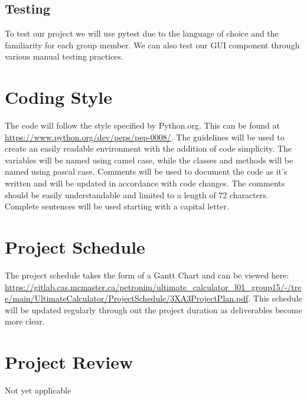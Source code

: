 \documentclass{article}
\begin{document}
\subsection{Testing}
To test our project we will use pytest due to the language of choice and the familiarity for each group member. We can also test our GUI component through various manual testing practices.


\section{Coding Style}
The code will follow the style specified by Python.org. This can be found at \url{https://www.python.org/dev/peps/pep-0008/}. The guidelines will be used to create an easily readable environment with the addition of code simplicity. The variables will be named using camel case, while the classes and methods will be named using pascal case. Comments will be used to document the code as it’s written and will be updated in accordance with code changes. The comments should be easily understandable and limited to a length of 72 characters. Complete sentences will be used starting with a capital letter.

\section{Project Schedule}

The project schedule takes the form of a Gantt Chart and can be viewed here: \url{https://gitlab.cas.mcmaster.ca/petronim/ultimate_calculator_l01_group15/-/tree/main/UltimateCalculator/ProjectSchedule/3XA3ProjectPlan.pdf}.
This schedule will be updated regularly through out the project duration as deliverables become more clear.

\section{Project Review}
Not yet applicable
\end{document}
